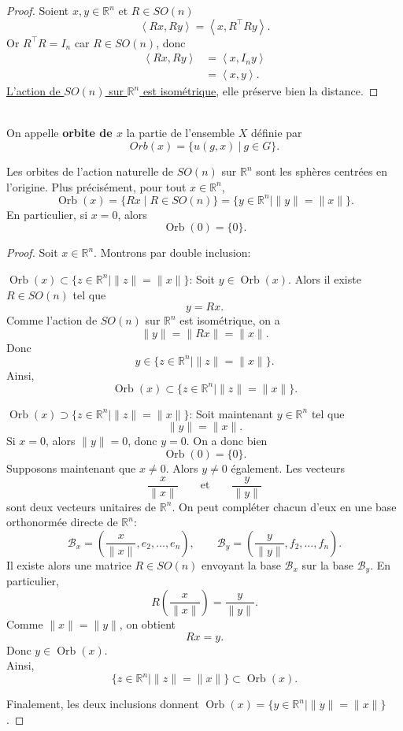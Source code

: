\documentclass[12pt]{report}
\begin{document}
\begin{proof}
Soient $x,y\in \mathbb{R}^n$ et $R\in SO(n)$\\
\[
\left\langle Rx,Ry\right\rangle=\left\langle x,R^{\top}Ry\right\rangle.
\]
Or $R^{\top}R=I_n$ car $R\in SO(n)$, donc
\[
\begin{aligned}
\left\langle Rx,Ry\right\rangle&=\left\langle x,I_{n}y\right\rangle\\
&=\left\langle x,y\right\rangle.
\end{aligned}
\]
\underline{L'action de $SO(n)$ sur $\mathbb{R}^n$ est isométrique}, elle préserve bien la distance.
\end{proof}

\begin{definition}\leavevmode\\
On appelle \textbf{orbite de $x$} la partie de l'ensemble $X$ définie par
\[
Orb(x)=\{u(g,x)~|~g\in G\}.
\]
\end{definition}

\begin{proposition}
Les orbites de l'action naturelle de $SO(n)$ sur $\mathbb{R}^n$ sont les sphères centrées en l'origine. Plus précisément, pour tout $x\in\mathbb{R}^n$,
\[
\operatorname{Orb}(x)=\{Rx \mid R\in SO(n)\}=\{y\in\mathbb{R}^n \mid \|y\|=\|x\|\}.
\]
En particulier, si $x=0$, alors
\[
\operatorname{Orb}(0)=\{0\}.
\]
\end{proposition}

\begin{proof}
Soit $x\in\mathbb{R}^n$. Montrons par double inclusion:

\underline{$\operatorname{Orb}(x)\subset\{z\in\mathbb{R}^n \mid \|z\|=\|x\|\}$}: Soit $y\in \operatorname{Orb}(x)$. Alors il existe $R\in SO(n)$ tel que
\[
y=Rx.
\]
Comme l'action de $SO(n)$ sur $\mathbb{R}^n$ est isométrique, on a
\[
\|y\|=\|Rx\|=\|x\|.
\]
Donc
\[
y\in \{z\in\mathbb{R}^n \mid \|z\|=\|x\|\}.
\]
Ainsi,
\[
\operatorname{Orb}(x)\subset\{z\in\mathbb{R}^n \mid \|z\|=\|x\|\}.
\]

\underline{$\operatorname{Orb}(x)\supset\{z\in\mathbb{R}^n \mid \|z\|=\|x\|\}$}: Soit maintenant $y\in\mathbb{R}^n$ tel que
\[
\|y\|=\|x\|.
\]
Si $x=0$, alors $\|y\|=0$, donc $y=0$. On a donc bien
\[
\operatorname{Orb}(0)=\{0\}.
\]
Supposons maintenant que $x\neq 0$. Alors $y\neq 0$ également. Les vecteurs
\[
\frac{x}{\|x\|}\qquad\text{et}\qquad\frac{y}{\|y\|}
\]
sont deux vecteurs unitaires de $\mathbb{R}^n$. On peut compléter chacun d'eux en une base orthonormée directe de $\mathbb{R}^n$:
\[
\mathcal{B}_x=\left(\frac{x}{\|x\|},e_2,\dots,e_n\right),\qquad\mathcal{B}_y=\left(\frac{y}{\|y\|},f_2,\dots,f_n\right).
\]
Il existe alors une matrice $R\in SO(n)$ envoyant la base $\mathcal{B}_x$ sur la base $\mathcal{B}_y$. En particulier,
\[
R\left(\frac{x}{\|x\|}\right)=\frac{y}{\|y\|}.
\]
Comme $\|x\|=\|y\|$, on obtient
\[
Rx=y.
\]
Donc $y\in \operatorname{Orb}(x)$.\\
Ainsi,
\[
\{z\in\mathbb{R}^n \mid \|z\|=\|x\|\}\subset\operatorname{Orb}(x).
\]

Finalement, les deux inclusions donnent \underline{$\operatorname{Orb}(x)=\{y\in\mathbb{R}^n \mid \|y\|=\|x\|\}$}.
\end{proof}
\end{document}
